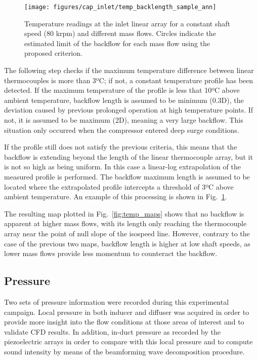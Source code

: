 \begin{figure}[tb!]
\centering
\texttt{[image: figures/cap\_inlet/temp\_backlength\_sample\_ann]}
\caption[Backflow length temperature criterion]{Temperature readings at the inlet linear array for a constant shaft speed (80 krpm) and different mass flows. Circles indicate the estimated limit of the backflow for each mass flow using the proposed criterion.}
\label{fig:temp_backlength_sample}
\end{figure}

The following step checks if the maximum temperature difference between linear thermocouples is more than 3ºC; if not,  a constant temperature profile has been detected. If the maximum temperature of the profile is less that 10ºC above ambient temperature, backflow length is assumed to be minimum (0.3D), the deviation caused by previous prolonged operation at high temperature points. If not, it is assumed to be maximum (2D), meaning a very large backflow. This situation only occurred when the compressor entered deep surge conditions.

If the profile still does not satisfy the previous criteria, this means that the backflow is extending beyond the length of the linear thermocouple array, but it is not so high as being uniform. In this case a linear-log extrapolation of the measured profile is performed. The backflow maximum length is assumed to be located where the extrapolated profile intercepts a threshold of 3ºC above ambient temperature. An example of this processing is shown in Fig.~\ref{fig:temp_backlength_sample}.

The resulting map plotted in Fig.~\ref{fig:temp_maps} shows that no backflow is apparent at higher mass flows, with its length only reaching the thermocouple array near the point of null slope of the isospeed line. However, contrary to the case of the previous two maps, backflow length is higher at low shaft speeds, as lower mass flows provide less momentum to counteract the backflow.

\subsection{Pressure}
\label{sub:pressure}

Two sets of pressure information were recorded during this experimental campaign. Local pressure in both inducer and diffuser was acquired in order to provide more insight into the flow conditions at those areas of interest and to validate CFD results. In addition, in-duct pressure as recorded by the piezoelectric arrays in order to compare with this local pressure and to compute sound intensity by means of the beamforming wave decomposition procedure.

